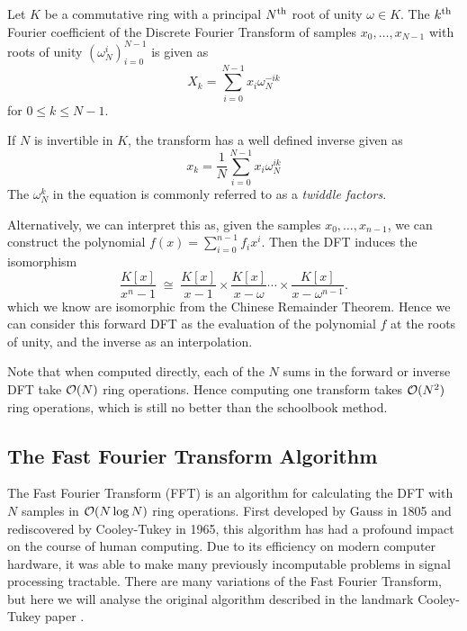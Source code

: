 \begin{definition}
    Let $K$ be a commutative ring with a principal $N^{\textrm{th}}$ root of unity $\omega \in K$.
    The $k^{\textrm{th}}$ Fourier coefficient of the Discrete Fourier Transform of samples $x_0, \ldots, x_{N-1}$ with roots of unity $(\omega_N^i)_{i=0}^{N-1}$ is given as
    \begin{equation}\label{eq:forward-dft}
        X_k = \sum^{N-1}_{i=0}x_i\omega_{N}^{-ik}
    \end{equation}
    for $0 \leq k \leq N-1$.

    If $N$ is invertible in $K$, the transform has a well defined inverse given as 
    \begin{equation}\label{eq:reverse-dft}
        x_k = \frac{1}{N}\sum^{N-1}_{i=0}x_i\omega_{N}^{ik}
    \end{equation}
    The $\omega_N^k$ in the equation is commonly referred to as a \textit{twiddle factors}.
\end{definition}

Alternatively, we can interpret this as, given the samples $x_0, \ldots, x_{n-1}$, we can construct the polynomial $f(x) = \sum_{i=0}^{n-1} f_i x^i$. Then the DFT induces the isomorphism
\[
    \frac{K[x]}{x^n - 1} \; \cong \; \frac{K[x]}{x - 1} \times \frac{K[x]}{x - \omega} \cdots \times \frac{K[x]}{x - \omega^{n-1}}.
\]
which we know are isomorphic from the Chinese Remainder Theorem.
Hence we can consider this forward DFT as the evaluation of the polynomial $f$ at the roots of unity, and the inverse as an interpolation.

Note that when computed directly, each of the $N$ sums in the forward or inverse DFT take $\mathcal O(N)$ ring operations. Hence computing one transform takes $\mathcal O(N^2)$ ring operations, which is still no better than the schoolbook method.

\subsection{The Fast Fourier Transform Algorithm}

The Fast Fourier Transform (FFT) is an algorithm for calculating the DFT with $N$ samples in $\mathcal O(N \log N)$ ring operations. First developed by Gauss in 1805 \cite{gauss} and rediscovered by Cooley-Tukey in 1965, this algorithm has had a profound impact on the course of human computing. Due to its efficiency on modern computer hardware, it was able to make many previously incomputable problems in signal processing tractable.
There are many variations of the Fast Fourier Transform, but here we will analyse the original algorithm described in the landmark Cooley-Tukey paper \cite{fft}.


